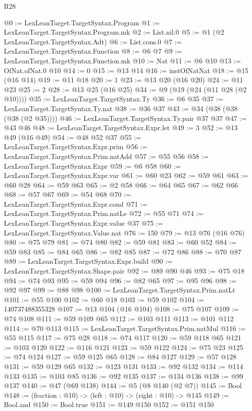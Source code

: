\begin{lexlean}{R28}
\begin{coremodule}
@0 := LexLeanTarget.TargetSyntax.Program
@1 := LexLeanTarget.TargetSyntax.Program.mk
@2 := List.nil.{0}
@5 := @1 (@2 LexLeanTarget.TargetSyntax.Adt)
@6 := List.cons.{0}
@7 := LexLeanTarget.TargetSyntax.Function
@8 := @6 @7
@9 := LexLeanTarget.TargetSyntax.Function.mk
@10 := Nat
@11 := @6 @10
@13 := OfNat.ofNat.{0} @10
@14 := 0
@15 := @13 @14
@16 := instOfNatNat
@18 := @15 (@16 @14)
@19 := @11 @18
@20 := 1
@23 := @13 @20 (@16 @20)
@24 := @11 @23
@25 := 2
@28 := @13 @25 (@16 @25)
@34 := @9 (@19 (@24 (@11 @28 (@2 @10))))
@35 := LexLeanTarget.TargetSyntax.Ty
@36 := @6 @35
@37 := LexLeanTarget.TargetSyntax.Ty.nat
@38 := @36 @37
@43 := @34 (@38 (@38 (@38 (@2 @35))))
@46 := LexLeanTarget.TargetSyntax.Ty.pair @37 @37
@47 := @43 @46
@48 := LexLeanTarget.TargetSyntax.Expr.let
@49 := 3
@52 := @13 @49 (@16 @49)
@54 := @48 @52 @37
@55 := LexLeanTarget.TargetSyntax.Expr.prim
@56 := LexLeanTarget.TargetSyntax.Prim.natAdd
@57 := @55 @56
@58 := LexLeanTarget.TargetSyntax.Expr
@59 := @6 @58
@60 := LexLeanTarget.TargetSyntax.Expr.var
@61 := @60 @23
@62 := @59 @61
@63 := @60 @28
@64 := @59 @63
@65 := @2 @58
@66 := @64 @65
@67 := @62 @66
@68 := @57 @67
@69 := @54 @68
@70 := LexLeanTarget.TargetSyntax.Expr.cond
@71 := LexLeanTarget.TargetSyntax.Prim.natLe
@72 := @55 @71
@74 := LexLeanTarget.TargetSyntax.Expr.value @37
@75 := LexLeanTarget.TargetSyntax.Value.nat
@76 := 150
@79 := @13 @76 (@16 @76)
@80 := @75 @79
@81 := @74 @80
@82 := @59 @81
@83 := @60 @52
@84 := @59 @83
@85 := @84 @65
@86 := @82 @85
@87 := @72 @86
@88 := @70 @87
@89 := LexLeanTarget.TargetSyntax.Expr.build
@90 := LexLeanTarget.TargetSyntax.Shape.pair
@92 := @89 @90 @46
@93 := @75 @18
@94 := @74 @93
@95 := @59 @94
@96 := @82 @65
@97 := @95 @96
@98 := @92 @97
@99 := @88 @98
@100 := LexLeanTarget.TargetSyntax.Prim.natLt
@101 := @55 @100
@102 := @60 @18
@103 := @59 @102
@104 := 140737488355328
@107 := @13 @104 (@16 @104)
@108 := @75 @107
@109 := @74 @108
@111 := @59 @109 @65
@112 := @103 @111
@113 := @101 @112
@114 := @70 @113
@115 := LexLeanTarget.TargetSyntax.Prim.natMul
@116 := @55 @115
@117 := @75 @28
@118 := @74 @117
@120 := @59 @118 @65
@121 := @103 @120
@122 := @116 @121
@123 := @59 @122
@124 := @75 @23
@125 := @74 @124
@127 := @59 @125 @65
@128 := @84 @127
@129 := @57 @128
@131 := @59 @129 @65
@132 := @123 @131
@133 := @92 @132
@134 := @114 @133
@135 := @103 @85
@136 := @92 @135
@137 := @134 @136
@138 := @99 @137
@140 := @47 (@69 @138)
@144 := @5 (@8 @140 (@2 @7))
@145 := Bool
@148 := (fraction : @10) -> (left : @10) -> (right : @10) -> @145
@149 := Bool.and
@150 := Bool.true
@151 := @149 @150
@152 := @151 @150

\end{coremodule}
\end{lexlean}
